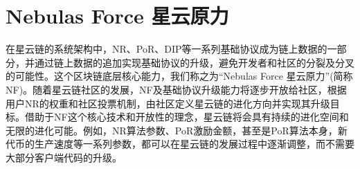 \section{Nebulas Force 星云原力}
在星云链的系统架构中，NR、PoR、DIP等一系列基础协议成为链上数据的一部分，并通过链上数据的追加实现基础协议的升级，避免开发者和社区的分裂及分叉的可能性。这个区块链底层核心能力，我们称之为“Nebulas Force 星云原力”(简称NF)。随着星云链社区的发展，NF及基础协议升级能力将逐步开放给社区，根据用户NR的权重和社区投票机制，由社区定义星云链的进化方向并实现其升级目标。借助于NF这个核心技术和开放性的理念，星云链将会具有持续的进化空间和无限的进化可能。例如，NR算法参数、PoR激励金额，甚至是PoR算法本身，新代币的生产速度等一系列参数，都可以在星云链的发展过程中逐渐调整，而不需要大部分客户端代码的升级。